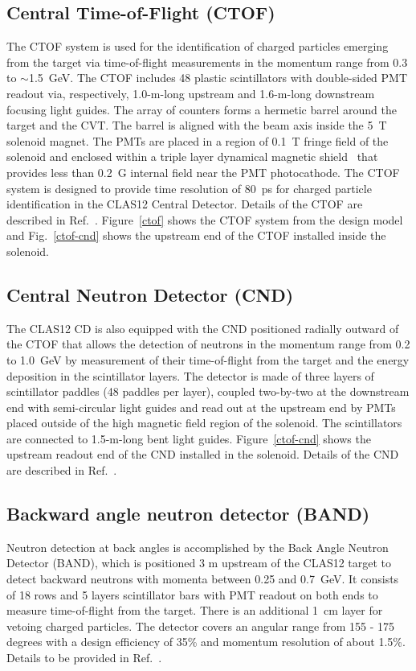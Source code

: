 \documentclass[final,3p,twocolumn]{elsarticle}
\begin{document}
\subsection{Central Time-of-Flight (CTOF)}

The CTOF system is used for the identification of charged particles emerging from the target via time-of-flight
measurements in the momentum range from 0.3 to $\sim$1.5~GeV. The CTOF includes 48 plastic scintillators with
double-sided PMT readout via, respectively, 1.0-m-long upstream and 1.6-m-long downstream focusing light guides.
The array of counters forms a hermetic barrel around the target and the CVT. The barrel is aligned with the beam
axis inside the 5~T solenoid magnet. The PMTs are placed in a region of 0.1~T fringe field of the solenoid and
enclosed within a triple layer dynamical magnetic shield~\cite{Baturin:2012zz} that provides less than 0.2~G
internal field near the PMT photocathode. The CTOF system is designed to provide time resolution of 80~ps for
charged particle identification in the CLAS12 Central Detector. Details of the CTOF are described in
Ref.~\cite{ctof-nim}. Figure~\ref{ctof} shows the CTOF system from the design model and Fig.~\ref{ctof-cnd}
shows the upstream end of the CTOF installed inside the solenoid.

\subsection{Central Neutron Detector (CND)}

The CLAS12 CD is also equipped with the CND positioned radially outward of the CTOF that allows the detection
of neutrons in the momentum range from 0.2 to 1.0~GeV by measurement of their time-of-flight from the target
and the energy deposition in the scintillator layers. The detector is made of three layers of scintillator paddles
(48 paddles per layer), coupled two-by-two at the downstream end with semi-circular light guides and read out at
the upstream end by PMTs placed outside of the high magnetic field region of the solenoid. The scintillators are
connected to 1.5-m-long bent light guides. Figure~\ref{ctof-cnd} shows the upstream readout end of the
CND installed in the solenoid. Details of the CND are described in Ref.~\cite{cnd-nim}.


\subsection{Backward angle neutron detector (BAND)}
Neutron detection at back angles is accomplished by the Back Angle Neutron Detector (BAND), which is 
positioned 3 m upstream of the CLAS12 target to detect backward neutrons with momenta between 0.25 and 0.7~GeV. 
It consists of 18 rows and 5 layers scintillator bars with PMT readout on both ends to measure time-of-flight from the target. 
There is an additional 1~cm layer for vetoing charged particles. The detector covers an angular range from 155 - 175 degrees with a design efficiency of 35\% and momentum resolution of about 1.5\%.  Details to be provided in Ref.~\cite{BAND}.
\end{document}
